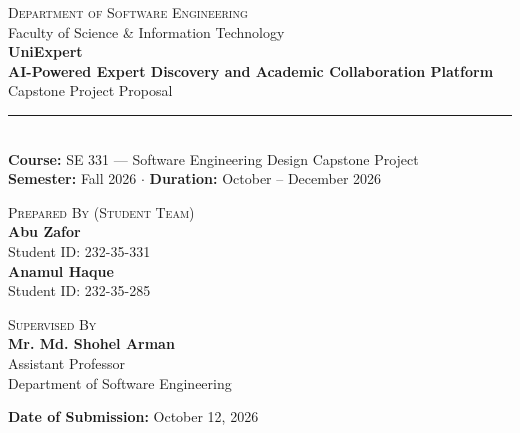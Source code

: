 \documentclass[11pt,a4paper]{article}
\begin{document}
\begin{titlepage}
    \centering
    \vspace*{1.2cm}
    
    {\large\scshape Department of Software Engineering}\\[0.2cm]
    {\normalsize Faculty of Science \& Information Technology}\\[2.2cm]
    
    {\Huge\bfseries\color{primary} UniExpert}\\[0.5cm]
    {\LARGE\bfseries\color{darkslate} AI-Powered Expert Discovery and Academic Collaboration Platform}\\[0.8cm]
    {\large\color{secondary} Capstone Project Proposal}\\[0.4cm]
    \rule{3.2in}{0.5pt}\\[0.6cm]
    
    {\normalsize\textbf{Course:} SE 331 --- Software Engineering Design Capstone Project}\\[0.25cm]
    {\normalsize\textbf{Semester:} Fall 2026 \quad $\cdot$ \quad \textbf{Duration:} October -- December 2026}\\[3.2cm]
    
    \begin{minipage}[t]{0.48\textwidth}
        \begin{flushleft}
            {\small\scshape Prepared By (Student Team)}\\[0.35cm]
            \textbf{Abu Zafor}\\
            {\small Student ID: 232-35-331}\\[0.25cm]
            \textbf{Anamul Haque}\\
            {\small Student ID: 232-35-285}
        \end{flushleft}
    \end{minipage}
    \hfill
    \begin{minipage}[t]{0.45\textwidth}
        \begin{flushright}
            {\small\scshape Supervised By}\\[0.35cm]
            \textbf{Mr. Md. Shohel Arman}\\[0.12cm]
            {\small Assistant Professor}\\
            {\small Department of Software Engineering}
        \end{flushright}
    \end{minipage}
    
    \vfill
    
    {\small\textbf{Date of Submission:} October 12, 2026}
    \vspace*{1.0cm}
\end{titlepage}
\end{document}
